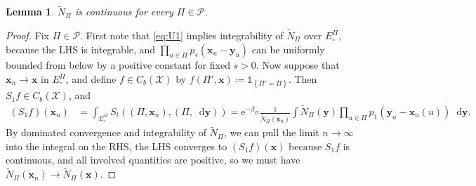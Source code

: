 \documentclass[reqno,draft]{amsart}
\numberwithin{equation}{section}
\theoremstyle{plain}
\newtheorem{lemma}[theorem]{Lemma}
\theoremstyle{remark}
\newcommand*\diff{\mathop{}\!\mathrm{d}}
\newcommand{\tendsto}[1]{\stackrel{#1}{\longrightarrow}}
\newcommand{\ind}{\mathds{1}}
\newcommand{\e}{\mathrm{e}}
\newcommand{\fpart}{\Pi} %
\newcommand{\semi}{S}
\newcommand{\nn}{\widetilde{N}} %
\newcommand{\la}{\beta} %
\begin{document}
\begin{lemma}\label{lem:Ncontinuous} %
    $\nn_\fpart$ is continuous for every $\fpart\in \mathcal{P}$.
\end{lemma}
\begin{proof}
    Fix $\fpart\in \mathcal{P}$. First note that \cref{eq:U1} implies integrability of $\nn_\fpart$ over $E^{\fpart}_\circ $, because the LHS is integrable, and $\prod_{u\in \fpart}p_s(\boldsymbol x_u-\boldsymbol y_u)$ can be uniformly bounded from below by a positive constant for fixed $s > 0$. Now suppose that $\boldsymbol x_n\to \boldsymbol x$ in $E^\fpart_\circ $, and define $f\in C_b(\mathcal{X})$ by $f(\fpart',\boldsymbol x) \coloneqq \ind_{\left\{ \fpart'= \fpart \right\} }$. Then $\semi_1 f \in C_b(\mathcal{X})$, and
    \begin{align*}
        (S_1 f)(\boldsymbol x_n)
        &= \int_{E^{\fpart}_\circ } \semi_t((\fpart,\boldsymbol x_n),(\fpart,\diff \boldsymbol y))
        = \e^{-\la_\fpart} \frac{1}{\nn_\fpart(\boldsymbol x_n)} \int \nn_\fpart(\boldsymbol y) \prod_{u\in \fpart} p_1(\boldsymbol y_u - \boldsymbol x_n(u)) \diff \boldsymbol y.
    \end{align*}
    By dominated convergence and integrability of $\nn_\fpart$, we can pull the limit $n\to \infty$ into the integral on the RHS, the LHS converges to $(\semi_1 f)(\boldsymbol x)$ because $\semi_1 f$ is continuous, and all involved quantities are positive,
    so we must have $\nn_\fpart(\boldsymbol x_n) \to \nn_\fpart(\boldsymbol x)$.
\end{proof}
\end{document}
